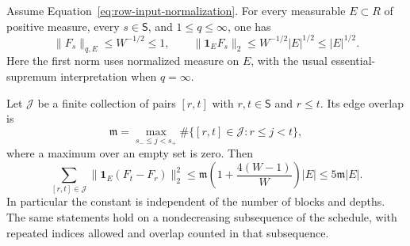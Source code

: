 \begin{lemma}
\label{lem:depth-input-size}
Assume Equation~\eqref{eq:row-input-normalization}.  For every measurable
$E\subset R$ of positive measure, every $s\in\mathsf S$, and
$1\le q\le\infty$, one has
\[
 \|F_s\|_{q,E}\le W^{-1/2}\le1,
 \qquad
 \|\mathbf1_EF_s\|_2\le W^{-1/2}|E|^{1/2}\le |E|^{1/2}.
\]
Here the first norm uses normalized measure on $E$, with the usual
essential-supremum interpretation when $q=\infty$.

Let $\mathcal J$ be a finite collection of pairs $[r,t]$ with
$r,t\in\mathsf S$ and $r\le t$.  Its edge overlap is
\[
 \mathfrak m=
 \max_{s_-\le j<s_+}
       \#\{[r,t]\in\mathcal J:r\le j<t\},
\]
where a maximum over an empty set is zero.  Then
\begin{equation}
 \sum_{[r,t]\in\mathcal J}
       \|\mathbf1_E(F_t-F_r)\|_2^2
 \le \mathfrak m\left(1+\frac{4(W-1)}W\right)|E|
 \le 5\mathfrak m|E|.
 \label{eq:row-variation}
\end{equation}
In particular the constant is independent of the number of blocks and
depths.  The same statements hold on a nondecreasing subsequence of the
schedule, with repeated indices allowed and overlap counted in that
subsequence.
\end{lemma}


